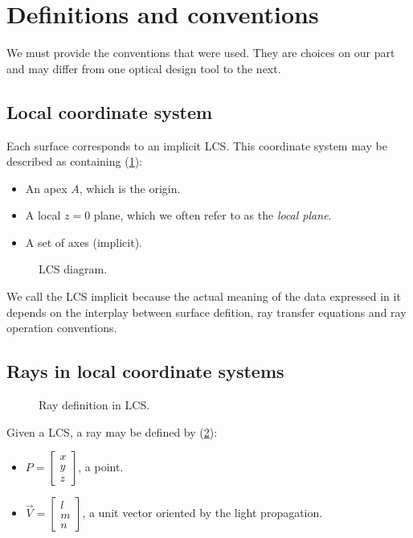 \section{Definitions and conventions}
We must provide the conventions that were used. They are choices
on our part and may differ from one optical design tool to the next.

\subsection{Local coordinate system}
Each surface corresponds to an implicit \gls{LCS}.
This coordinate system may be described as containing (\cref{fig:LCS}):

\begin{itemize}
\item An apex $A$, which is the origin.
\item A local $z=0$ plane, which we often refer to as the \emph{local plane}.
\item A set of axes (implicit).
\end{itemize}

\begin{figure} \caption{\label{fig:LCS} LCS diagram.}

\end{figure}

We call the \gls{LCS} implicit because the actual meaning of the data
expressed in it depends on the interplay between surface defition, ray
transfer equations and ray operation conventions.

\subsection{Rays in local coordinate systems}

\begin{figure} \caption{\label{fig:ray-in-LCS} Ray definition
in \gls{LCS}.}

\end{figure}

Given a \gls{LCS}, a ray may be defined by (\cref{fig:ray-in-LCS}):
\begin{itemize}
\item $P = \begin{bmatrix}x \\ y \\ z \end{bmatrix}$, a point.
\item $\overrightarrow{V} = \begin{bmatrix} l \\ m \\ n \end{bmatrix}$, a unit
vector oriented by the light propagation.
\end{itemize}


